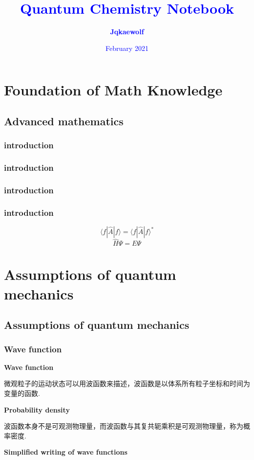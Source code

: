 \documentclass[28pt,openany]{book}
\title{\chuhao \textbf{\textcolor{blue}{Quantum Chemistry Notebook}}}
\author{\huge \textbf{\textcolor{blue}{Jqkaewolf}}}
\date{\huge \textcolor{blue}{February 2021}}
\newcommand{\erhao}{\fontsize{22pt}{28pt}\selectfont}    %
\newcommand{\sihao}{\fontsize{14pt}{21pt}\selectfont}    %
\begin{document}
\maketitle
\tableofcontents
\part{Foundation of Math Knowledge}
\chapter{Advanced mathematics}
\section{introduction}
\section{introduction}
\section{introduction}
\section{introduction}
\erhao$$\langle f|\hat{A}|f\rangle=\langle f|\hat{A}|f\rangle^{*}$$
\newpage
$$\hat{H}\Psi=E\Psi$$
\part{Assumptions of quantum mechanics}
\setcounter{chapter}{0}
\chapter{Assumptions of quantum mechanics}
\section{Wave function}
\sihao\textbf{ }
\textbf{Wave function}

微观粒子的运动状态可以用波函数来描述，波函数是以体系所有粒子坐标和时间为变量的函数.

\textbf{ }

\textbf{Probability density}

波函数本身不是可观测物理量，而波函数与其复共轭乘积是可观测物理量，称为概率密度.

\textbf{ }

\textbf{Simplified writing of wave functions}
\end{document}
